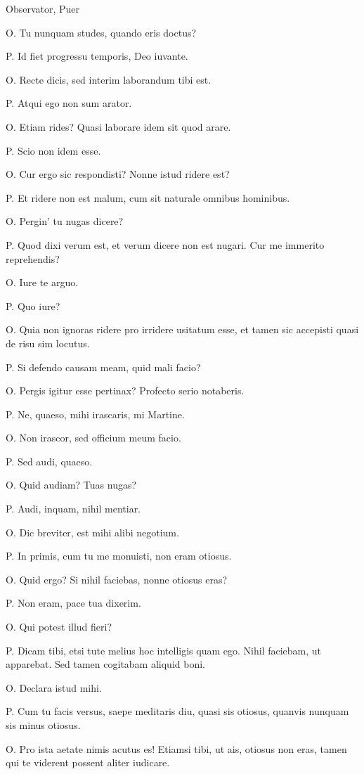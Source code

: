 \documentclass{article}
\begin{document}
Observator, Puer

O. Tu nunquam studes, quando eris doctus?

P. Id fiet progressu temporis, Deo iuvante. 

O. Recte dicis, sed interim laborandum tibi est. 

P. Atqui ego non sum arator. 

O. Etiam rides? Quasi laborare idem sit quod arare. 

P. Scio non idem esse. 

O. Cur ergo sic respondisti? Nonne istud ridere est?

P. Et ridere non est malum, cum sit naturale omnibus hominibus. 

O. Pergin’ tu nugas dicere?

P. Quod dixi verum est, et verum dicere non est nugari. Cur me immerito reprehendis?

O. Iure te arguo. 

P. Quo iure?

O. Quia non ignoras ridere pro irridere usitatum esse, et tamen sic accepisti quasi de risu sim locutus. 

P. Si defendo causam meam, quid mali facio?

O. Pergis igitur esse pertinax? Profecto serio notaberis. 

P. Ne, quaeso, mihi irascaris, mi Martine. 

O. Non irascor, sed officium meum facio. 

P. Sed audi, quaeso. 

O. Quid audiam? Tuas nugas?

P. Audi, inquam, nihil mentiar. 

O. Dic breviter, est mihi alibi negotium. 

P. In primis, cum tu me monuisti, non eram otiosus. 

O. Quid ergo? Si nihil faciebas, nonne otiosus eras?

P. Non eram, pace tua dixerim. 

O. Qui potest illud fieri?

P. Dicam tibi, etsi tute melius hoc intelligis quam ego. Nihil faciebam, ut apparebat. Sed tamen cogitabam aliquid boni. 

O. Declara istud mihi. 

P. Cum tu facis versus, saepe meditaris diu, quasi sis otiosus, quanvis nunquam sis minus otiosus. 

O. Pro ista aetate nimis acutus es! Etiamsi tibi, ut ais, otiosus non eras, tamen qui te viderent possent aliter iudicare. 
\end{document}
